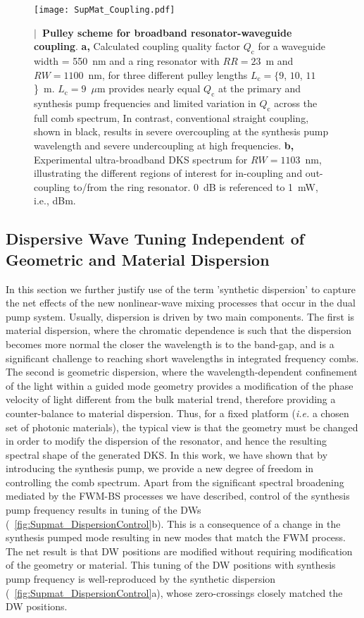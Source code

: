 \documentclass[reprint,superscriptaddress, amsmath,amssymb,pra, aps,floatfix,longbibliography]{revtex4-1}
\begin{document}
\begin{figure}[!t]
 \begin{center}
  \texttt{[image: SupMat\_Coupling.pdf]}
 \end{center}
 \caption{\label{fig:coupling} \textbf{$|$~Pulley scheme for broadband resonator-waveguide coupling}. \textbf{a,} Calculated coupling quality factor $Q_\mathrm{c}$ for a waveguide width = 550~nm and a ring resonator with $RR=23$~{\textmu}m and $RW=1100$~nm, for three different pulley lengths $L_\mathrm{c}=\{9$, $10$, $11$\}~{\textmu}m. $L_\mathrm{c}=9$~$\mu$m provides nearly equal $Q_\mathrm{c}$ at the primary and synthesis pump frequencies and limited variation in $Q_\mathrm{c}$ across the full comb spectrum, In contrast, conventional straight coupling, shown in black, results in severe overcoupling at the synthesis pump wavelength and severe undercoupling at high frequencies. \textbf{b,} Experimental ultra-broadband DKS spectrum for $RW=1103$~nm, illustrating the different regions of interest for in-coupling and out-coupling to/from the ring resonator. 0~dB is referenced to 1~mW, i.e., dBm.}
\end{figure}


\subsection{Dispersive Wave Tuning Independent of Geometric and Material Dispersion}

In this section we further justify use of the term 'synthetic dispersion' to capture the net effects of the new nonlinear-wave mixing processes that occur in the dual pump system. Usually, dispersion is driven by two main components. The first is material dispersion, where the chromatic dependence is such that the dispersion becomes more normal the closer the wavelength is to the band-gap, and is a significant challenge to reaching short wavelengths in integrated frequency combs. The second is geometric dispersion, where the wavelength-dependent confinement of the light within a guided mode geometry provides a modification of the phase velocity of light different from the bulk material trend, therefore providing a counter-balance to material dispersion. Thus, for a fixed platform (\textit{i.e.} a chosen set of photonic materials), the typical view is that the geometry must be changed in order to modify the dispersion of the resonator, and hence the resulting spectral shape of the generated DKS. In this work, we have shown that by introducing the synthesis pump, we provide a new degree of freedom in controlling the comb spectrum. Apart from the significant spectral broadening mediated by the FWM-BS processes we have described, control of the synthesis pump frequency results in tuning of the DWs (~\cref{fig:Supmat_DispersionControl}b). This is a consequence of a change in the synthesis pumped mode resulting in new modes that match the FWM process. The net result is that DW positions are modified without requiring modification of the geometry or material. This tuning of the DW positions with synthesis pump frequency is well-reproduced by the synthetic dispersion (~\cref{fig:Supmat_DispersionControl}a), whose zero-crossings closely matched the DW positions.
\end{document}
